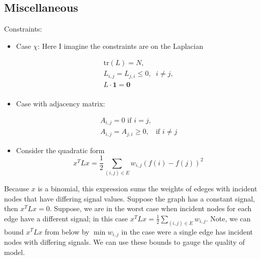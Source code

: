 \documentclass[
]{article}
\providecommand{\tightlist}{%
  \setlength{\itemsep}{0pt}\setlength{\parskip}{0pt}}
\begin{document}
\hypertarget{miscellaneous}{%
\subsection{Miscellaneous}\label{miscellaneous}}

Constraints:

\begin{itemize}
\tightlist
\item
  Case \(\chi\): Here I imagine the constraints are on the Laplacian
\end{itemize}

\begin{equation}
\begin{aligned}
&\quad \text{tr}(L) = N, \\
&\quad L_{i,j} = L_{j,i} \leq 0, \phantom{..} i \neq j, \\
&\quad L\cdot \textbf{1} = \textbf{0} \\
\end{aligned}
\end{equation}

\begin{itemize}
\tightlist
\item
  Case with adjacency matrix:
\end{itemize}

\begin{equation}
\begin{aligned}
&\quad A_{i,j} = 0 \text{ if } i = j, \\
&\quad A_{i,j} = A_{j,i} \geq 0, \phantom{..} \text{ if } i \neq j
\end{aligned}
\end{equation}

\begin{itemize}
\tightlist
\item
  Consider the quadratic form \[
  x^TLx = \frac{1}{2}\sum_{(i,j)\in E}w_{i,j}(f(i) - f(j))^2
  \]
\end{itemize}

Because \(x\) is a binomial, this expression sums the weights of edeges
with incident nodes that have differing signal values. Suppose the graph
has a constant signal, then \(x^TLx = 0\). Suppose, we are in the worst
case when incident nodes for each edge have a different signal; in this
case \(x^TLx = \frac{1}{2}\sum_{(i,j) \in E}w_{i,j}\). Note, we can
bound \(x^TLx\) from below by \(\min{w_{i,j}}\) in the case were a
single edge has incident nodes with differing signals. We can use these
bounds to gauge the quality of model.
\end{document}
